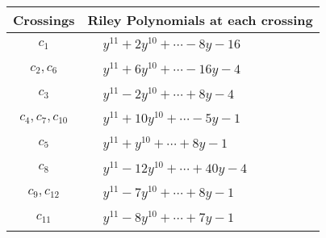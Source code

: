 \documentclass[1p]{elsarticle_modified}
\theoremstyle{definition}
\begin{document}
\begin{tabular}{m{50pt}|m{274pt}}
Crossings & \hspace{64pt}Riley Polynomials at each crossing \\
\hline $$\begin{aligned}c_{1}\end{aligned}$$&$\begin{aligned}
&y^{11}+2 y^{10}+\cdots-8 y-16
\end{aligned}$\\
\hline $$\begin{aligned}c_{2},c_{6}\end{aligned}$$&$\begin{aligned}
&y^{11}+6 y^{10}+\cdots-16 y-4
\end{aligned}$\\
\hline $$\begin{aligned}c_{3}\end{aligned}$$&$\begin{aligned}
&y^{11}-2 y^{10}+\cdots+8 y-4
\end{aligned}$\\
\hline $$\begin{aligned}c_{4},c_{7},c_{10}\end{aligned}$$&$\begin{aligned}
&y^{11}+10 y^{10}+\cdots-5 y-1
\end{aligned}$\\
\hline $$\begin{aligned}c_{5}\end{aligned}$$&$\begin{aligned}
&y^{11}+y^{10}+\cdots+8 y-1
\end{aligned}$\\
\hline $$\begin{aligned}c_{8}\end{aligned}$$&$\begin{aligned}
&y^{11}-12 y^{10}+\cdots+40 y-4
\end{aligned}$\\
\hline $$\begin{aligned}c_{9},c_{12}\end{aligned}$$&$\begin{aligned}
&y^{11}-7 y^{10}+\cdots+8 y-1
\end{aligned}$\\
\hline $$\begin{aligned}c_{11}\end{aligned}$$&$\begin{aligned}
&y^{11}-8 y^{10}+\cdots+7 y-1
\end{aligned}$\\
\hline
\end{tabular}\\~\\
\end{document}
